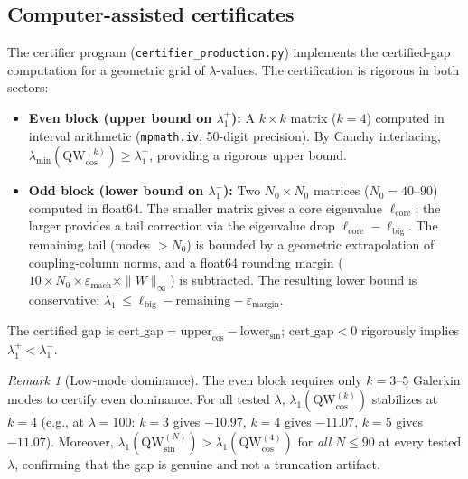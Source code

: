 \documentclass[12pt,a4paper]{article}
\theoremstyle{definition}
\theoremstyle{remark}
\newtheorem{remark}[theorem]{Remark}
\begin{document}
\subsection{Computer-assisted certificates}
\label{sec:certificates}

The certifier program (\texttt{certifier\_production.py}) implements the certified-gap computation for a geometric grid of $\lambda$-values. The certification is rigorous in both sectors:
\begin{itemize}
  \item \textbf{Even block (upper bound on $\lambda_1^+$):} A $k \times k$ matrix ($k = 4$) computed in interval arithmetic (\texttt{mpmath.iv}, 50-digit precision). By Cauchy interlacing, $\lambda_{\min}(\mathrm{QW}_{\cos}^{(k)}) \geq \lambda_1^+$, providing a rigorous upper bound.
  \item \textbf{Odd block (lower bound on $\lambda_1^-$):} Two $N_0 \times N_0$ matrices ($N_0 = 40$--$90$) computed in float64. The smaller matrix gives a core eigenvalue $\ell_{\mathrm{core}}$; the larger provides a tail correction via the eigenvalue drop $\ell_{\mathrm{core}} - \ell_{\mathrm{big}}$. The remaining tail (modes $> N_0$) is bounded by a geometric extrapolation of coupling-column norms, and a float64 rounding margin ($10 \times N_0 \times \varepsilon_{\mathrm{mach}} \times \|W\|_\infty$) is subtracted. The resulting lower bound is conservative: $\lambda_1^- \leq \ell_{\mathrm{big}} - \mathrm{remaining} - \varepsilon_{\mathrm{margin}}$.
\end{itemize}
The certified gap is $\mathrm{cert\_gap} = \mathrm{upper}_{\cos} - \mathrm{lower}_{\sin}$; $\mathrm{cert\_gap} < 0$ rigorously implies $\lambda_1^+ < \lambda_1^-$.

\begin{remark}[Low-mode dominance]
\label{rem:low-mode}
The even block requires only $k = 3$--$5$ Galerkin modes to certify even dominance. For all tested $\lambda$, $\lambda_1(\mathrm{QW}_{\cos}^{(k)})$ stabilizes at $k = 4$ (e.g., at $\lambda = 100$: $k = 3$ gives $-10.97$, $k = 4$ gives $-11.07$, $k = 5$ gives $-11.07$). Moreover, $\lambda_1(\mathrm{QW}_{\sin}^{(N)}) > \lambda_1(\mathrm{QW}_{\cos}^{(4)})$ for \emph{all} $N \leq 90$ at every tested $\lambda$, confirming that the gap is genuine and not a truncation artifact.
\end{remark}
\end{document}
